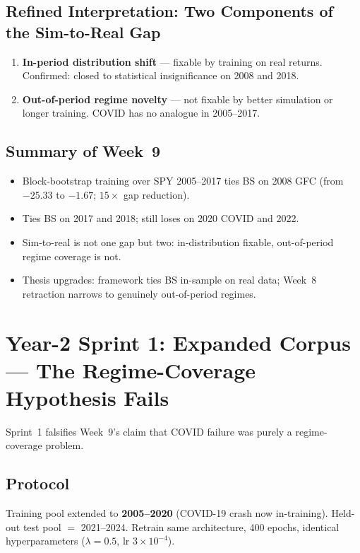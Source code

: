 \documentclass[11pt, a4paper]{article}
\begin{document}
\subsection{Refined Interpretation: Two Components of the Sim-to-Real Gap}

\begin{enumerate}
\item \textbf{In-period distribution shift} --- fixable by training on real
returns. Confirmed: closed to statistical insignificance on 2008 and 2018.
\item \textbf{Out-of-period regime novelty} --- not fixable by better
simulation or longer training. COVID has no analogue in 2005--2017.
\end{enumerate}

\subsection{Summary of Week~9}
\begin{itemize}
\item Block-bootstrap training over SPY 2005--2017 ties BS on 2008 GFC
      (from $-25.33$ to $-1.67$; $15\times$ gap reduction).
\item Ties BS on 2017 and 2018; still loses on 2020 COVID and 2022.
\item Sim-to-real is not one gap but two: in-distribution fixable,
      out-of-period regime coverage is not.
\item Thesis upgrades: framework ties BS in-sample on real data; Week~8
      retraction narrows to genuinely out-of-period regimes.
\end{itemize}


\section{Year-2 Sprint 1: Expanded Corpus --- The Regime-Coverage Hypothesis Fails}
\label{sec:sprint1}

Sprint~1 falsifies Week~9's claim that COVID failure was purely a
regime-coverage problem.

\subsection{Protocol}

Training pool extended to \textbf{2005--2020} (COVID-19 crash now in-training).
Held-out test pool $=$ 2021--2024. Retrain same architecture, 400 epochs,
identical hyperparameters ($\lambda=0.5$, lr $3\times10^{-4}$).
\end{document}
